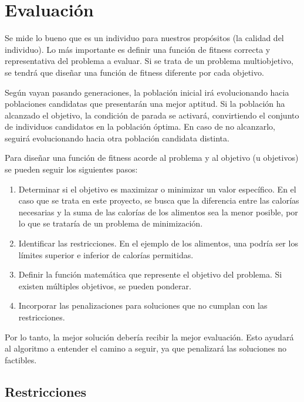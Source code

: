 \section{Evaluación}
\label{ch:evaluacion}

Se mide lo bueno que es un individuo para nuestros propósitos (la calidad del individuo). Lo más importante es definir una función de fitness correcta y representativa del problema a evaluar. Si se trata de un problema multiobjetivo, se tendrá que diseñar una función de fitness diferente por cada objetivo.

Según vayan pasando generaciones, la población inicial irá evolucionando hacia poblaciones candidatas que presentarán una mejor aptitud. Si la población ha alcanzado el objetivo, la condición de parada se activará, convirtiendo el conjunto de individuos candidatos en la población óptima. En caso de no alcanzarlo, seguirá evolucionando hacia otra población candidata distinta.

Para diseñar una función de fitness acorde al problema y al objetivo (u objetivos) se pueden seguir los siguientes pasos:

\begin{enumerate}
  \item Determinar si el objetivo es maximizar o minimizar un valor específico. En el caso que se trata en este proyecto, se busca que la diferencia entre las calorías necesarias y la suma de las calorías de los alimentos sea la menor posible, por lo que se trataría de un problema de minimización.
  \item Identificar las restricciones. En el ejemplo de los alimentos, una podría ser los límites superior e inferior de calorías permitidas.
  \item Definir la función matemática que represente el objetivo del problema. Si existen múltiples objetivos, se pueden ponderar.
  \item Incorporar las penalizaciones para soluciones que no cumplan con las restricciones.
\end{enumerate}

Por lo tanto, la mejor solución debería recibir la mejor evaluación. Esto ayudará al algoritmo a entender el camino a seguir, ya que penalizará las soluciones no factibles.

\subsection{Restricciones}
\label{ch:restricciones}


